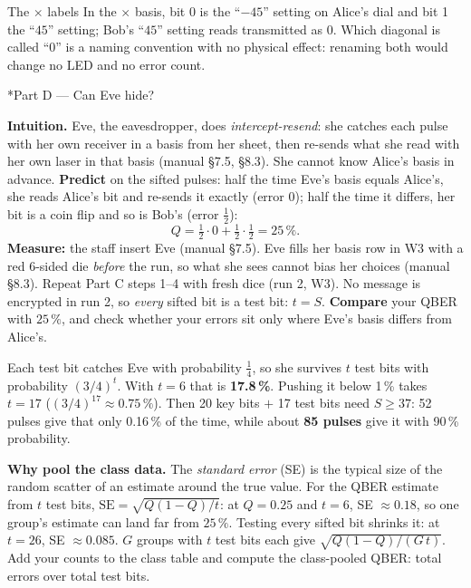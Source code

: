 \documentclass[a4paper,11pt]{article}
\makeatletter
\renewcommand\section{\@startsection{section}{1}{\z@}{-1.6ex \@plus -.5ex}{0.6ex}{\normalfont\large\bfseries\color{ibmblue}}}
\makeatother
\begin{document}
\begin{labelbox}{The $\times$ labels}
In the $\times$ basis, bit 0 is the ``$-45$'' setting on Alice's dial and bit 1 the
``$45$'' setting; Bob's ``$45$'' setting reads transmitted as 0. Which diagonal is called
``0'' is a naming convention with no physical effect: renaming both would change no LED
and no error count.
\end{labelbox}

\section*{Part D --- Can Eve hide?}

\textbf{Intuition.} Eve, the eavesdropper, does \emph{intercept-resend}: she catches each pulse with her own
receiver in a basis from her sheet, then re-sends what she read with her own laser in
that basis (manual \S7.5, \S8.3). She cannot know Alice's basis in advance.
\textbf{Predict} on the sifted pulses: half the time Eve's basis equals Alice's, she
reads Alice's bit and re-sends it exactly (error 0); half the time it differs, her bit
is a coin flip and so is Bob's (error $\tfrac12$):
\begin{equation*}
  Q = \tfrac12\cdot 0 + \tfrac12\cdot\tfrac12 = 25\,\%.
\end{equation*}
\textbf{Measure:} the staff insert Eve (manual \S7.5). Eve fills her basis row in W3 with a red
6-sided die \emph{before} the run, so what she sees cannot bias her choices (manual \S8.3). Repeat
Part C steps 1--4 with fresh dice (run 2, W3). No message is encrypted in run 2, so
\emph{every} sifted bit is a test bit: $t = S$. \textbf{Compare}
your QBER with $25\,\%$, and check whether your errors sit only where Eve's basis
differs from Alice's.

\begin{shockbox}
Each test bit catches Eve with probability $\tfrac14$, so she survives $t$ test bits with
probability $(3/4)^t$. With $t = 6$ that is \textbf{17.8\,\%}. Pushing it below 1\,\% takes $t = 17$ ($(3/4)^{17} \approx 0.75\,\%$). Then
20 key bits $+$ 17 test bits need $S \ge 37$: 52 pulses give that only 0.16\,\% of the
time, while about \textbf{85 pulses} give it with 90\,\% probability.
\end{shockbox}

\textbf{Why pool the class data.} The \emph{standard error} (SE) is the typical size of
the random scatter of an estimate around the true value. For the QBER estimate from $t$
test bits, $\text{SE} = \sqrt{Q(1-Q)/t}$: at $Q = 0.25$ and $t = 6$, SE $\approx 0.18$,
so one group's estimate can land far from $25\,\%$. Testing every sifted bit shrinks it:
at $t = 26$, SE $\approx 0.085$. $G$ groups with $t$ test
bits each give $\sqrt{Q(1-Q)/(G\,t)}$. Add your counts to the class table and compute the
class-pooled QBER: total errors over total test bits.
\end{document}
